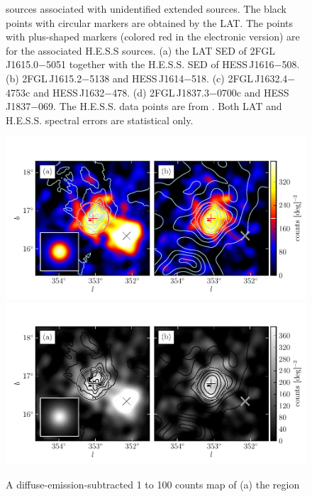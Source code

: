 \begin{figure}
{    sources associated with unidentified
    extended \tev sources.  The black points
    with circular markers are obtained by the LAT. The points with
    plus-shaped markers (colored red in the electronic version) are
    for the associated H.E.S.S sources.  (a) the
    LAT SED of 2FGL\,J1615.0$-$5051 together with the H.E.S.S. SED
    of HESS\,J1616$-$508. (b) 2FGL\,J1615.2$-$5138
    and HESS\,J1614$-$518. (c) 2FGL\,J1632.4$-$4753c
    and HESS\,J1632$-$478. (d) 2FGL\,J1837.3$-$0700c
    and HESS\,J1837$-$069. The H.E.S.S. data points are from
    \citep{aharonian_2006_h.e.s.s.-survey}. Both LAT and H.E.S.S. spectral errors are
    statistical only.}
  \end{figure}

\begin{figure}
    \ifcolorfigure
      \includegraphics{source_plots/source_Ophiuchus_color.pdf}
    \else
      \includegraphics{source_plots/source_Ophiuchus_bw.pdf}
    \fi
  \caption{
  A diffuse-emission-subtracted 1 \gev to 100 \gev counts map of (a) the region
}
\end{figure}
